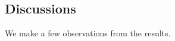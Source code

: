 \documentclass[letterpaper]{article} %
\begin{document}

\subsection{Discussions}
We make a few observations from the results. %
\end{document}
